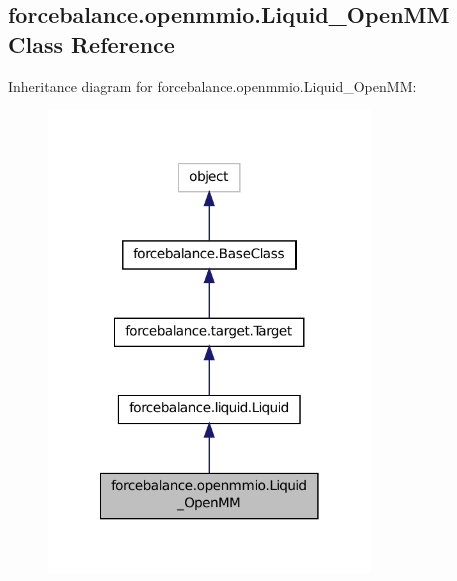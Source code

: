 \hypertarget{classforcebalance_1_1openmmio_1_1Liquid__OpenMM}{\subsection{forcebalance.\-openmmio.\-Liquid\-\_\-\-Open\-M\-M Class Reference}
\label{classforcebalance_1_1openmmio_1_1Liquid__OpenMM}
}


Inheritance diagram for forcebalance.\-openmmio.\-Liquid\-\_\-\-Open\-M\-M\-:\nopagebreak
\begin{figure}[H]
\begin{center}
\leavevmode
\includegraphics[width=242pt]{classforcebalance_1_1openmmio_1_1Liquid__OpenMM__inherit__graph}
\end{center}
\end{figure}


